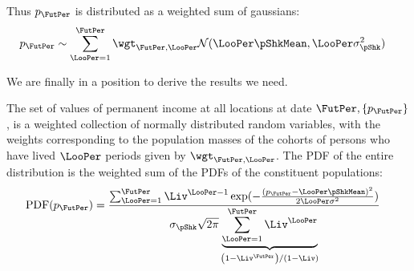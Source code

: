 \documentclass[../BufferStockTheory.tex]{subfiles}\usepackage{ApndxSteadyState}
\begin{document}
  Thus $\pLog_{\FutPer}$ is distributed as a weighted sum of gaussians:
  \begin{equation}\begin{gathered}\begin{aligned}
    \pLog_{\FutPer} & \sim \sum_{\LooPer=1}^{\FutPer}\wgt_{\FutPer,\LooPer}\mathcal{N}(\LooPer \pShkMean,\LooPer \sigma^{2}_{\pShk})
  \end{aligned}\end{gathered}\end{equation}

  We are finally in a position to derive the results we need.

  The set of values of permanent income at all locations at date $\FutPer,\{\pLog_{\FutPer}\}$, is a weighted collection of normally distributed random variables, with the weights corresponding to the population masses of the cohorts of persons who have lived $\LooPer$ periods given by $\wgt_{\FutPer,\LooPer}$.  The PDF of the entire distribution is the weighted sum of the PDFs of the constituent populations:
  \begin{equation}\begin{gathered}\begin{aligned}
    \PDF(\pLog_{\FutPer}) & = \frac{\sum _{\LooPer=1}^{\FutPer}
                            \Liv^{\LooPer-1}
                            \exp({-\frac{(\pLog_{\FutPer}-\LooPer \pShkMean )^2}{2
                            \LooPer \sigma ^2}})}{
                            \sigma_{\pShk} \sqrt{2 \pi }
                            \underbrace{
                            \sum_{\LooPer=1}^{\FutPer}\Liv^{\LooPer}
                            }_{\left(1-\Liv^{\FutPer}\right)/(1-\Liv)}
                            }
  \end{aligned}\end{gathered}\end{equation}
\end{document}
